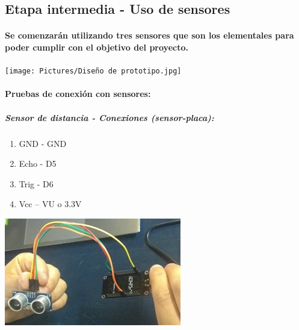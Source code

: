 \documentclass[12pt]{article} %
\newcommand{\normalsubparagraph}[1]{\subparagraph{\textnormal{#1}}}
\newcommand{\normalparagraph}[1]{\paragraph{\textnormal{#1}}}
\begin{document}

\subsection{Etapa intermedia - Uso de sensores} %
\normalparagraph {Se comenzarán utilizando tres sensores que son los elementales para poder cumplir con el objetivo del proyecto. }


\begin{center}
\begin{minipage}[c]{0.75\textwidth} %
  \centering
  \texttt{[image: Pictures/Diseño de prototipo.jpg]}
  \label{fig:prototipo}
\end{minipage}
\end{center}




\normalparagraph {Pruebas de conexión con sensores:}
\normalsubparagraph {Sensor de distancia - Conexiones (sensor-placa):}

\begin{enumerate}[itemsep=1pt] %
    \item GND - GND
    \item Echo - D5
    \item Trig - D6
    \item Vcc – VU o 3.3V
\end{enumerate}


\begin{center}
\begin{minipage}[c]{0.4\textwidth} %
  \centering
  \includegraphics[width=\linewidth]{Pictures/Sensor distancia.jpg}
  \label{fig:sensor-distancia}
\end{minipage}
\end{center}
\end{document}
